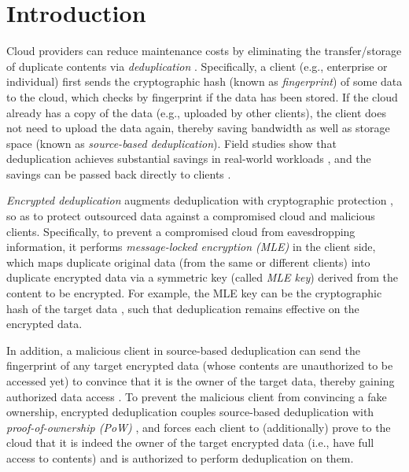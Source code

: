\section{Introduction}
\label{sec:intro}


Cloud providers can reduce maintenance costs by eliminating the transfer/storage of duplicate contents via {\em deduplication} \cite{harnik10}. Specifically, a client (e.g., enterprise or individual) first sends the cryptographic hash (known as {\em fingerprint}) of some data to the cloud, which checks by fingerprint if the data has been stored. If the cloud already has a copy of the data (e.g., uploaded by other clients), the client does not need to upload the data again, thereby saving bandwidth as well as storage space (known as {\em source-based deduplication}). Field studies show that deduplication achieves
substantial savings in real-world workloads \cite{jin09, meyer11, wallace12}, and the savings can be passed back directly  to clients \cite{bellare13b, armknecht15}.



{\em Encrypted deduplication} augments deduplication with cryptographic protection \cite{bellare13a, halevi11}, so as to protect outsourced data against a compromised cloud and malicious clients. Specifically, to prevent a compromised cloud from eavesdropping information, it performs {\em message-locked encryption (MLE)} \cite{bellare13a} in the client side, which maps duplicate original data (from the same or different clients) into duplicate encrypted data via a symmetric key (called {\em MLE key}) derived from the content to be encrypted. For example, the MLE key can be the cryptographic hash of the target data \cite{douceur02}, such that deduplication remains effective on the encrypted data.

In addition, a malicious client in source-based deduplication can send the fingerprint of any target encrypted data (whose contents are unauthorized to be accessed yet) to convince that it is the owner of the target data, thereby gaining authorized data access \cite{halevi11, mulazzani11}. To prevent the malicious client from convincing a fake ownership,
encrypted deduplication couples source-based deduplication with {\em proof-of-ownership (PoW)} \cite{halevi11}, and forces each client to (additionally) prove to the cloud that it is indeed the owner of the target encrypted data (i.e., have full access to  contents) and is authorized to perform deduplication on them.


